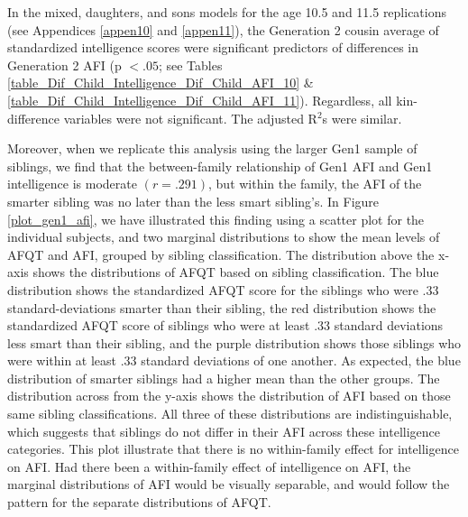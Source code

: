 \documentclass[a4paper,man,apacite,natbib,12pt,longtable]{apa6}\usepackage[]{graphicx}\usepackage[]{color}
\begin{document}
In the mixed, daughters, and sons models for the age 10.5 and 11.5 replications (see Appendices \ref{appen10} and \ref{appen11}), the Generation 2 cousin average of standardized intelligence scores were significant predictors of differences in Generation 2 AFI (p $< .05$; see Tables \ref{table_Dif_Child_Intelligence_Dif_Child_AFI_10} \& \ref{table_Dif_Child_Intelligence_Dif_Child_AFI_11}). Regardless, all kin-difference variables were not significant. The adjusted R$^{2}$s were similar. 

Moreover, when we replicate this analysis using the larger Gen1 sample of siblings, we find that the between-family relationship of Gen1 AFI and Gen1 intelligence is moderate $(r =.291)$, but within the family, the AFI of the smarter sibling was no later than the less smart sibling's. In Figure \ref{plot_gen1_afi}, we have illustrated this finding using a scatter plot for the individual subjects, and two marginal distributions to show the mean levels of AFQT and AFI, grouped by sibling classification. The distribution above the x-axis shows the distributions of AFQT based on sibling classification. The blue distribution shows the standardized AFQT score for the siblings who were .33 standard-deviations smarter than their sibling, the red distribution shows the standardized AFQT score of siblings who were at least .33 standard deviations less smart than their sibling, and the purple distribution shows those siblings who were within at least .33 standard deviations of one another. As expected, the blue distribution of smarter siblings had a higher mean than the other groups. The distribution across from the y-axis shows the distribution of AFI based on those same sibling classifications. All three of these distributions are indistinguishable, which suggests that siblings do not differ in their AFI across these intelligence categories. This plot illustrate that there is no within-family effect for intelligence on AFI. Had there been a within-family effect of intelligence on AFI, the marginal distributions of AFI would be visually separable, and would follow the pattern for the separate distributions of AFQT.%
\end{document}
